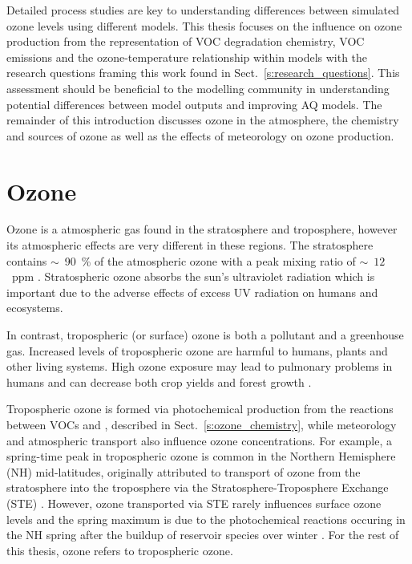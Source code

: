 Detailed process studies are key to understanding differences between simulated ozone levels using different models.
This thesis focuses on the influence on ozone production from the representation of VOC degradation chemistry, VOC emissions and the ozone-temperature relationship within models with the research questions framing this work found in Sect.~\ref{s:research_questions}.
This assessment should be beneficial to the modelling community in understanding potential differences between model outputs and improving AQ models.
The remainder of this introduction discusses ozone in the atmosphere, the chemistry and sources of ozone as well as the effects of meteorology on ozone production.

\section{Ozone} \label{s:ozone}
Ozone is a atmospheric gas found in the stratosphere and troposphere, however its atmospheric effects are very different in these regions.
The stratosphere contains $\sim$~90~\% of the atmospheric ozone with a peak mixing ratio of $\sim$~$12$~ppm \citep{Seinfeld:2006}.
Stratospheric ozone absorbs the sun's ultraviolet radiation which is important due to the adverse effects of excess UV radiation on humans and ecosystems.

In contrast, tropospheric (or surface) ozone is both a pollutant and a greenhouse gas. 
Increased levels of tropospheric ozone are harmful to humans, plants and other living systems. 
High ozone exposure may lead to pulmonary problems in humans and can decrease both crop yields and forest growth \citep{WMO:2010}. 

Tropospheric ozone is formed via photochemical production from the reactions between VOCs and , described in Sect.~\ref{s:ozone_chemistry}, while meteorology and atmospheric transport also influence ozone concentrations.
For example, a spring-time peak in tropospheric ozone is common in the Northern Hemisphere (NH) mid-latitudes, originally attributed to transport of ozone from the stratosphere into the troposphere via the Stratosphere-Troposphere Exchange (STE) \citep{Monks:2000}.
However, ozone transported via STE rarely influences surface ozone levels \citep{Lelieveld:2000} and the spring maximum is due to the photochemical reactions occuring in the NH spring after the buildup of reservoir species over winter \citep{Penkett:1986}.
For the rest of this thesis, ozone refers to tropospheric ozone.

